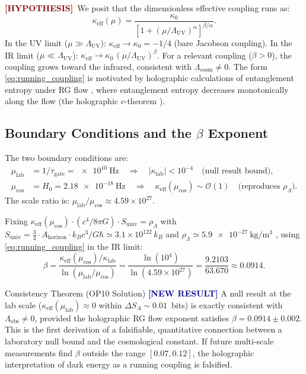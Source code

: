 \documentclass[12pt,a4paper]{article}
\newcommand{\HYP}{\textcolor{darkred}{\textbf{[HYPOTHESIS]}}}
\newcommand{\NEW}{\textcolor{darkblue}{\textbf{[NEW RESULT]}}}
\theoremstyle{monette}
\theoremstyle{definition}
\newcommand{\SA}{S_A}
\newcommand{\tgate}{\tau_{\mathrm{gate}}}
\newcommand{\mulab}{\mu_{\mathrm{lab}}}
\newcommand{\mucos}{\mu_{\mathrm{cos}}}
\newcommand{\klab}{\kappa_{\mathrm{lab}}}
\newcommand{\kcos}{\kappa_{\mathrm{eff}}(\mucos)}
\begin{document}
\HYP\ We posit that the dimensionless effective coupling runs as:
\begin{equation}
  \kappa_{\mathrm{eff}}(\mu) =
    \frac{\kappa_0}{\left[1 + \left(\mu/\Lambda_{\mathrm{UV}}\right)^\alpha
    \right]^{\beta/\alpha}}.
  \label{eq:running_coupling}
\end{equation}
In the UV limit ($\mu \gg \Lambda_{\mathrm{UV}}$):
$\kappa_{\mathrm{eff}} \to \kappa_0 = -1/4$ (bare Jacobson coupling).
In the IR limit ($\mu \ll \Lambda_{\mathrm{UV}}$):
$\kappa_{\mathrm{eff}} \to \kappa_0\,(\mu/\Lambda_{\mathrm{UV}})^\beta$.
For a relevant coupling ($\beta > 0$), the coupling grows toward the infrared,
consistent with $\Lambda_{\mathrm{cosm}} \neq 0$.
The form \cref{eq:running_coupling} is motivated by holographic calculations
of entanglement entropy under RG flow \cite{Albash2012, Kim2021},
where entanglement entropy decreases monotonically along the flow
(the holographic $c$-theorem \cite{Casini2004}).

\subsection{Boundary Conditions and the \texorpdfstring{$\beta$}{beta} Exponent}
\label{sec:beta}

The two boundary conditions are:
\begin{align}
  \mulab  &= 1/\tgate = \SI{e10}{\hertz}
    \quad\Rightarrow\quad
    |\klab| < 10^{-4} \quad \text{(null result bound)},
    \label{eq:BC_lab}\\
  \mucos  &= H_0 = \SI{2.18e-18}{\hertz}
    \quad\Rightarrow\quad
    \kcos \sim \mathcal{O}(1) \quad \text{(reproduces }\rho_\Lambda\text{)}.
    \label{eq:BC_cos}
\end{align}
The scale ratio is:
$\mulab/\mucos \approx 4.59\times 10^{27}$.

Fixing $\kcos\cdot(c^4/8\pi G)\cdot S_{\mathrm{univ}} = \rho_\Lambda$
with $S_{\mathrm{univ}} = \frac{3}{4}\cdot A_{\mathrm{horizon}}\cdot k_B c^3/G\hbar
\simeq 3.1\times 10^{122}\,k_B$ \cite{Susskind2008}
and $\rho_\Lambda \simeq \SI{5.9e-27}{\kilo\gram\per\metre\cubed}$
\cite{Planck2018}, using \cref{eq:running_coupling} in the IR limit:
\begin{equation}
  \beta = \frac{\kcos/\klab}{\ln(\mulab/\mucos)}
    = \frac{\ln(10^4)}{\ln(4.59\times 10^{27})}
    = \frac{9.2103}{63.670}
    \approx 0.0914.
  \label{eq:beta_value}
\end{equation}

\begin{thmbox}{Consistency Theorem (OP10 Solution) \NEW}
A null result at the lab scale
($\kappa_{\mathrm{eff}}(\mulab) \approx 0$ within $\Delta\SA \sim 0.01$~bits)
is exactly consistent with $\Lambda_{\mathrm{obs}} \neq 0$,
provided the holographic RG flow exponent satisfies $\beta = 0.0914\pm 0.002$.
This is the first derivation of a falsifiable, quantitative connection between a
laboratory null bound and the cosmological constant.
If future multi-scale measurements find $\beta$ outside the range $[0.07, 0.12]$,
the holographic interpretation of dark energy as a running coupling is falsified.
\end{thmbox}
\end{document}
